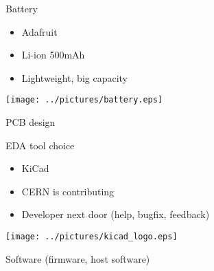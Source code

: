 \documentclass[compress,red]{beamer}
\begin{document}
\begin{frame}{Battery}

  \begin{block}{}
    \begin{itemize}
    \item Adafruit
    \item Li-ion 500mAh
    \item Lightweight, big capacity
    \end{itemize}
  \end{block}

  \begin{center}
    \texttt{[image: ../pictures/battery.eps]}
  \end{center}

  \begin{center}

  \end{center}

  \note[item]{}

\end{frame}

\begin{frame}{PCB design}

  \begin{block}{EDA tool choice}
    \begin{itemize}
    \item KiCad
    \item CERN is contributing
    \item Developer next door (help, bugfix, feedback)
    \end{itemize}
  \end{block}

  \begin{center}
    \texttt{[image: ../pictures/kicad\_logo.eps]}
  \end{center}

  \note[item]{}

\end{frame}

\begin{frame}{Software (firmware, host software)}

  \begin{center}
  \end{center}

  \note[item]{}

\end{frame}
\end{document}
